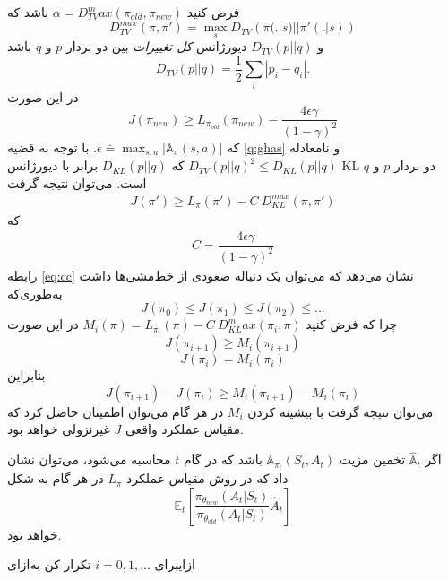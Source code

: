 فرض کنید 
$\alpha = D_{TV}^max(\pi_{old}, \pi_{new})$
باشد که 
$$D_{TV}^{max} (\pi, \pi') = \max_{s} D_{TV}\left(\pi(.|s) || \pi'(.|s)\right)$$
و 
$D_{TV}(p || q)$
دیورژانس 
\textit{کل تغییرات}
بین دو بردار $p$ و $q$ باشد
$$D_{TV}(p || q) = \dfrac{1}{2} \sum_{i} |p_i - q_i|.$$ در این صورت
$$J(\pi_{new}) \ge L_{\pi_{old}}(\pi_{new}) - \dfrac{4 \epsilon \gamma}{(1- \gamma)^2}$$ که $\epsilon \doteq \max_{s,a} |\mathbb{A}_\pi(s,a)|$.
\label{q:ghas}
با توجه به قضیه \ref{q:ghas} و نامعادله $D_{TV}(p || q)^2 \le D_{KL}(p || q)$  که  $D_{KL} (p || q)$ برابر با دیورژانس KL دو بردار $p$ و $q$ است\cite{schulman2015trust}. می‌توان  نتیجه گرفت
\begin{align*}
	J(\pi') \ge L_{\pi}(\pi') - C \ D_{KL}^{max}(\pi, \pi')
\end{align*}
که
\begin{align}
	C = \dfrac{4 \epsilon \gamma}{(1-\gamma)^2}
	\label{eq:cc}
\end{align}
رابطه \ref{eq:cc} نشان می‌دهد که می‌توان یک دنباله صعودی از خط‌مشی‌ها داشت به‌طوری‌که
$$J(\pi_0) \le J(\pi_1) \le J(\pi_2) \le ... $$
چرا که فرض کنید
$M_i(\pi) = L_{\pi_i}(\pi) - C \ D_{KL}^max(\pi_i, \pi)$
در این صورت
 $$J(\pi_{i+1}) \ge M_i(\pi_{i+1}) $$ 
$$J(\pi_i) = M_i(\pi_i)$$
بنابراین
$$J(\pi_{i+1}) - J(\pi_i) \ge M_i(\pi_{i+1}) - M_i(\pi_i)$$
می‌توان نتیجه گرفت با بیشینه کردن $M_i$ در هر گام می‌توان اطمینان حاصل کرد که مقیاس عملکرد واقعی $J$ غیرنزولی خواهد بود.

اگر $\hat{\mathbb{A}}_t$ تخمین مزیت 
$\mathbb{A}_{\pi_t}(S_t, A_t)$
باشد که در گام $t$ محاسبه می‌شود، می‌توان نشان داد که در روش
مقیاس عملکرد $L_\pi$ در هر گام به شکل
$$\mathbb{E}_t\left[\dfrac{\pi_{\theta_{new}}(A_t| S_t)}{\pi_{\theta_{old}}(A_t|S_t)} \hat{A}_t \right]$$خواهد بود.


‌ازای{برای 
	$i=0,1,...$
	تکرار کن}
‌به‌ازای


